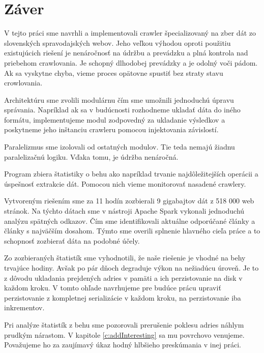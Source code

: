 
\chapter{Záver}
\label{summary}



V tejto práci sme navrhli a implementovali crawler špecializovaný na zber dát zo slovenských spravodajských webov. Jeho veľkou výhodou oproti použitiu existujúcich riešení je nenáročnosť na údržbu a prevádzku a plná kontrola nad priebehom crawlovania. Je schopný dlhodobej prevádzky a je odolný voči pádom. Ak sa vyskytne chyba, vieme proces opätovne spustiť bez straty stavu crowlovania. 

Architektúru sme zvolili modulárnu čím sme umožnili jednoduchú úpravu správania. Napríklad ak sa v budúcnosti rozhodneme ukladať dáta do iného formátu, implementujeme modul zodpovedný za ukladanie výsledkov a poskytneme jeho inštanciu crawleru pomocou injektovania závislostí.  

Paralelizmus sme izolovali od ostatných modulov. Tie teda nemajú žiadnu paralelizačnú logiku. Vďaka tomu, je údržba nenáročná. 

Program zbiera štatistiky o behu ako napríklad trvanie najdôležitejších operácii a úspešnosť extrakcie dát. Pomocou nich vieme monitorovať nasadené crawlery. 

Vytvoreným riešením sme za 11 hodín zozbierali 9 gigabajtov dát z 518 000 web stránok. Na týchto dátach sme v nástroji Apache Spark vykonali jednoduchú analýzu spätných odkazov. Čím sme identifikovali aktuálne odporúčané články a články s najväčším dosahom. Týmto sme overili splnenie hlavného cieľa práce a to schopnosť zozbierať dáta na podobné účely.  

Zo zozbieraných štatistík sme vyhodnotili, že naše riešenie je vhodné na behy trvajúce hodiny. Avšak po pár dňoch degraduje výkon na nežiadúcu úroveň. Je to z dôvodu ukladania prejdených adries v pamäti a ich perzistovanie na disk v každom kroku. V tomto ohľade navrhujeme pre budúce prácu upraviť perzistovanie z kompletnej serializácie v každom kroku, na perzistovanie iba inkrementov. 

Pri analýze štatistík z behu sme pozorovali prerušenie poklesu adries náhlym prudkým nárastom. V kapitole \ref{c:addInteresting} sa mu povrchovo venujeme. Považujeme ho za zaujímavý úkaz hodný hlbšieho preskúmania v inej práci.  


